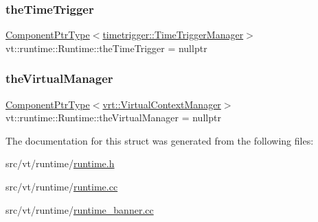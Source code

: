 \subsubsection{\texorpdfstring{the\+Time\+Trigger}{theTimeTrigger}}
{\footnotesize\ttfamily \hyperlink{structvt_1_1runtime_1_1_runtime_a0893bf0a8c03b898e8ab66b52cec80ad}{Component\+Ptr\+Type}$<$\hyperlink{structvt_1_1timetrigger_1_1_time_trigger_manager}{timetrigger\+::\+Time\+Trigger\+Manager}$>$ vt\+::runtime\+::\+Runtime\+::the\+Time\+Trigger = nullptr}

\mbox{\label{structvt_1_1runtime_1_1_runtime_a85a0606ac06cd173561952676f09c077}} 
\subsubsection{\texorpdfstring{the\+Virtual\+Manager}{theVirtualManager}}
{\footnotesize\ttfamily \hyperlink{structvt_1_1runtime_1_1_runtime_a0893bf0a8c03b898e8ab66b52cec80ad}{Component\+Ptr\+Type}$<$\hyperlink{structvt_1_1vrt_1_1_virtual_context_manager}{vrt\+::\+Virtual\+Context\+Manager}$>$ vt\+::runtime\+::\+Runtime\+::the\+Virtual\+Manager = nullptr}



The documentation for this struct was generated from the following files\+:\begin{DoxyCompactItemize}
\item 
src/vt/runtime/\hyperlink{runtime_8h}{runtime.\+h}\item 
src/vt/runtime/\hyperlink{runtime_8cc}{runtime.\+cc}\item 
src/vt/runtime/\hyperlink{runtime__banner_8cc}{runtime\+\_\+banner.\+cc}\end{DoxyCompactItemize}
